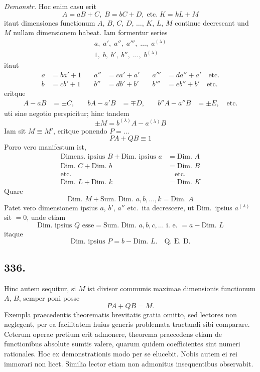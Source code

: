 \documentclass[12pt,a4paper]{article}
\begin{document}
\textit{Demonstr.} Hoc enim casu erit
\[
A = aB + C,\; B = bC + D,\; \text{etc.}\; K = kL + M
\]
itaut dimensiones functionum $A$, $B$, $C$, $D$, $\ldots$, $K$, $L$, $M$ continue decrescant und $M$ nullam dimensionem habeat. Iam formentur series
\[
\begin{aligned}
a,\; a',\; a'',\; a''',\; \ldots,\; a^{(\lambda)}\\
1,\; b,\; b',\; b'',\; \ldots,\; b^{(\lambda)}
\end{aligned}
\]
itaut
\[
\begin{aligned}
a &= ba' + 1\quad & a'' &= ca' + a'\quad & a''' &= da'' + a'\quad \text{etc.}\\
b &= cb' + 1\quad & b'' &= db' + b'\quad & b''' &= eb'' + b'\quad \text{etc.}
\end{aligned}
\]
eritque
\[
\begin{aligned}
A - aB &= \pm C,\quad & bA - a'B &= \mp D,\quad & b''A - a''B &= \pm E,\quad \text{etc.}
\end{aligned}
\]
uti sine negotio perspicitur; hinc tandem
\[
\pm M = b^{(\lambda)}A - a^{(\lambda)}B
\]
Iam sit $M\equiv M'$, eritque ponendo $P=\ldots$
\[
PA + QB \equiv 1
\]
Porro vero manifestum ist,
\[
\begin{aligned}
\text{Dimens.\ ipsius } B + \text{Dim.\ ipsius } a &= \text{Dim.\ } A\\
\text{Dim.\ } C + \text{Dim.\ } b &= \text{Dim.\ } B\\
\text{etc.} & \quad \text{etc.}\\
\text{Dim.\ } L + \text{Dim.\ } k &= \text{Dim.\ } K
\end{aligned}
\]
Quare
\[
\text{Dim.\ } M + \text{Sum.\ Dim.\ } a,b,\ldots,k = \text{Dim.\ } A
\]
Patet vero dimensionem ipsius $a$, $b'$, $a''$ etc.~ita decrescere, ut Dim.~ipsius $a^{(\lambda)}$ sit $=0$, unde etiam
\[
\text{Dim.\ ipsius } Q \text{ esse} = \text{Sum.\ Dim.\ } a,b,c,\ldots \text{ i.~e.\ } = a - \text{Dim.\ } L
\]
itaque
\[
\text{Dim.\ ipsius } P = b - \text{Dim.\ } L. \quad \text{Q.~E.~D.}
\]

\subsection*{336.}

Hinc autem sequitur, si $M$ ist divisor communis maximae dimensionis functionum $A$, $B$, semper poni posse
\[
PA + QB = M.
\]
Exempla praecedentis theorematis brevitatis gratia omitto, sed lectores non neglegent, per ea facilitatem huius generis problemata tractandi sibi comparare. Ceterum operae pretium erit admonere, theorema praecedens etiam de functionibus absolute sumtis valere, quarum quidem coefficientes sint numeri rationales. Hoc ex demonstrationis modo per se elucebit. Nobis autem ei rei immorari non licet. Similia lector etiam non admonitus insequentibus observabit.
\end{document}
